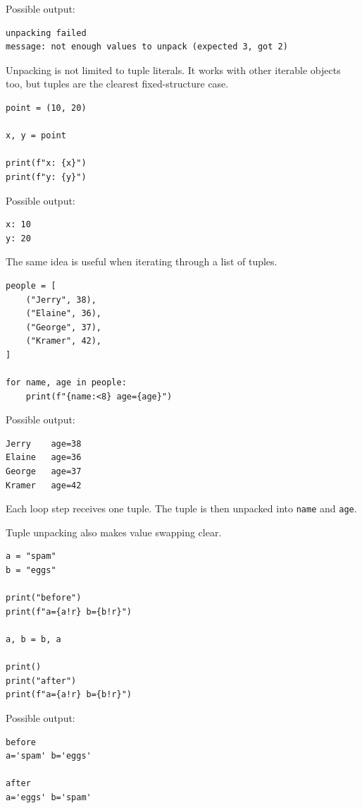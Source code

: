 Possible output:

\begin{verbatim}
unpacking failed
message: not enough values to unpack (expected 3, got 2)
\end{verbatim}

Unpacking is not limited to tuple literals. It works with other iterable objects too, but tuples are the clearest fixed-structure case.

\begin{verbatim}
point = (10, 20)

x, y = point

print(f"x: {x}")
print(f"y: {y}")
\end{verbatim}

Possible output:

\begin{verbatim}
x: 10
y: 20
\end{verbatim}

The same idea is useful when iterating through a list of tuples.

\begin{verbatim}
people = [
    ("Jerry", 38),
    ("Elaine", 36),
    ("George", 37),
    ("Kramer", 42),
]

for name, age in people:
    print(f"{name:<8} age={age}")
\end{verbatim}

Possible output:

\begin{verbatim}
Jerry    age=38
Elaine   age=36
George   age=37
Kramer   age=42
\end{verbatim}

Each loop step receives one tuple. The tuple is then unpacked into \texttt{name} and \texttt{age}.

Tuple unpacking also makes value swapping clear.

\begin{verbatim}
a = "spam"
b = "eggs"

print("before")
print(f"a={a!r} b={b!r}")

a, b = b, a

print()
print("after")
print(f"a={a!r} b={b!r}")
\end{verbatim}

Possible output:

\begin{verbatim}
before
a='spam' b='eggs'

after
a='eggs' b='spam'
\end{verbatim}

